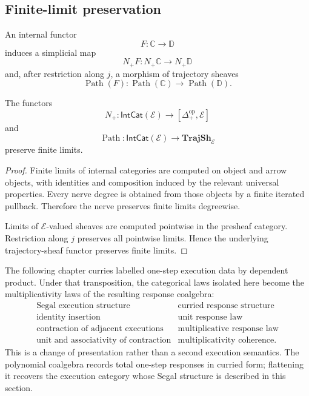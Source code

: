 \subsection{Finite-limit preservation}
\label{subsec:path-nerve-finite-limits}

An internal functor
\[
    F:\mathbb C\to\mathbb D
\]
induces a simplicial map
\[
    N_+F:N_+\mathbb C\to N_+\mathbb D
\]
and, after restriction along \(j\), a morphism of trajectory sheaves
\[
    \operatorname{Path}(F):
    \operatorname{Path}(\mathbb C)
    \to
    \operatorname{Path}(\mathbb D).
\]

\begin{proposition}
\label{prop:temp-finite-limit-preservation}
The functors
\[
    N_+:
    \mathsf{IntCat}(\mathcal E)
    \to
    [\Delta_+^{\mathrm{op}},\mathcal E]
\]
and
\[
    \operatorname{Path}:
    \mathsf{IntCat}(\mathcal E)
    \to
    \mathbf{TrajSh}_{\mathcal E}
\]
preserve finite limits.
\end{proposition}

\begin{proof}
Finite limits of internal categories are computed on object and arrow objects,
with identities and composition induced by the relevant universal properties.
Every nerve degree is obtained from those objects by a finite iterated
pullback. Therefore the nerve preserves finite limits degreewise.

Limits of \(\mathcal E\)-valued sheaves are computed pointwise in the
presheaf category. Restriction along \(j\) preserves all pointwise limits.
Hence the underlying trajectory-sheaf functor preserves finite limits.
\end{proof}

\begin{remark}
\label{rem:segal-to-polynomial-multiplicativity}
The following chapter curries labelled one-step execution data by dependent
product.  Under that transposition, the categorical laws isolated here become
the multiplicativity laws of the resulting response coalgebra:
\[
\begin{array}{c|c}
    \text{Segal execution structure}
    &
    \text{curried response structure}
    \\
    \hline
    \text{identity insertion}
    &
    \text{unit response law}
    \\
    \text{contraction of adjacent executions}
    &
    \text{multiplicative response law}
    \\
    \text{unit and associativity of contraction}
    &
    \text{multiplicativity coherence}.
\end{array}
\]
This is a change of presentation rather than a second execution semantics.
The polynomial coalgebra records total one-step responses in curried form;
flattening it recovers the execution category whose Segal structure is
described in this section.
\end{remark}

